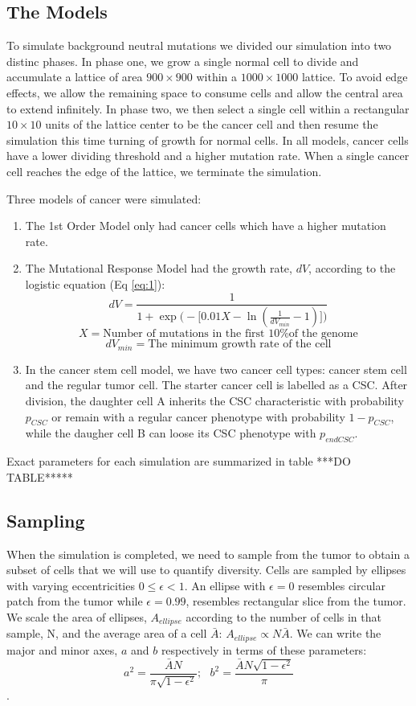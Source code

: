 \documentclass[12pt]{article}
\begin{document}
\subsection{The Models}
To simulate background neutral mutations we divided our simulation into two distinc phases. In phase one, we grow a single normal cell to divide and accumulate a lattice of area $900\times900$ within a $1000\times1000$ lattice. To avoid edge effects, we allow the remaining space to consume cells and allow the central area to extend infinitely. In phase two, we then select a single cell within a rectangular $10\times10$ units of the lattice center to be the cancer cell and then resume the simulation this time turning of growth for normal cells. In all models, cancer cells have a lower dividing threshold and a higher mutation rate. When a single cancer cell reaches the edge of the lattice, we terminate the simulation.

Three models of cancer were simulated: 
\begin{enumerate}
	\item The 1st Order Model only had cancer cells which have a higher mutation rate. 
	\item The Mutational Response Model had the growth rate, $dV$, according to the logistic equation (Eq \ref{eq:1}):
	\begin{equation} \label{eq:1}
	dV = \frac{1}{1+\exp\big(-\big[0.01X-\ln(\frac{1}{dV_{min}}-1)\big]\big)}
	\end{equation}
	\[
	X = \text{Number of mutations in the first 10\% of the genome}
	\]\[
	dV_{min} = \text{The minimum growth rate of the cell}
	\]
	\item In the cancer stem cell model, we have two cancer cell types: cancer stem cell and the regular tumor cell. The starter cancer cell is labelled as a CSC. After division, the daughter cell A inherits the CSC characteristic with probability $p_{CSC}$ or remain with a regular cancer phenotype with probability $1-p_{CSC}$, while the daugher cell B can loose its CSC phenotype with $p_{endCSC}$. 
\end{enumerate}

Exact parameters for each simulation are summarized in table ***DO TABLE*****

\subsection{Sampling}
When the simulation is completed, we need to sample from the tumor to obtain a subset of cells that we will use to quantify diversity. Cells are sampled by ellipses with varying eccentricities $0 \leq \epsilon < 1$. An ellipse with $\epsilon=0$ resembles circular patch from the tumor while $\epsilon = 0.99$, resembles rectangular slice from the tumor. We scale the area of ellipses, $A_{ellipse}$ according to the number of cells in that sample, N, and the average area of a cell $\bar{A}$: $A_{ellipse} \propto N\bar{A}$. We can write the major and minor axes, $a$ and $b$ respectively in terms of these parameters:
\[ a^2 = \frac{\bar{A}N}{\pi\sqrt{1-\epsilon^2}};~~~ b^2 = \frac{\bar{A}N\sqrt{1-\epsilon^2}}{\pi}\].
\end{document}
